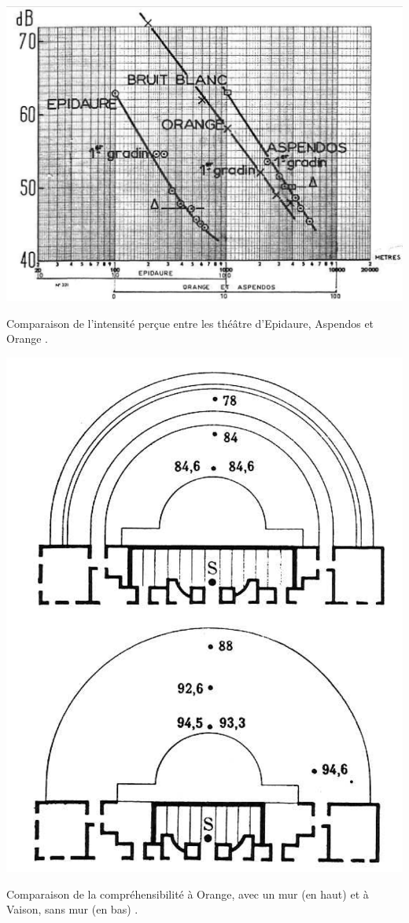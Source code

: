\begin{figureth}
	\includegraphics[width=0.7\linewidth]{images/canac_comparaison}
	\caption[Comparaison de l'intensité perçue entre les théâtre d'Epidaure, Aspendos et Orange.]{Comparaison de l'intensité perçue entre les théâtre d'Epidaure, Aspendos et Orange \footnotemark.}
	\label{canac_comparaison}
\end{figureth}
%
\begin{figureth}
	\includegraphics[width=0.7\linewidth]{images/canac_comparaison2}
	\caption[Comparaison de la compréhensibilité à Orange, avec un mur (en haut) et à Vaison, sans mur (en bas).]{Comparaison de la compréhensibilité à Orange, avec un mur (en haut) et à Vaison, sans mur (en bas) \footnotemark.}
	\label{canac_comparaison2}
\end{figureth}

